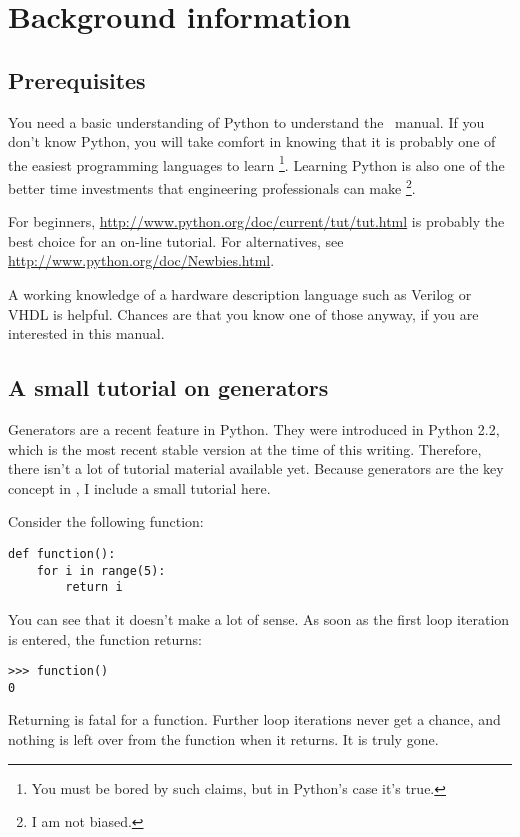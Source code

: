 \chapter{Background information}

\section{Prerequisites}

You need a basic understanding of Python to understand the \myhdl\
manual. If you don't know Python, you will take comfort in knowing
that it is probably one of the easiest programming languages to
learn \footnote{You must be bored by such claims, but in Python's
case it's true.}. Learning Python is also one of the better time
investments that engineering professionals can make \footnote{I am not
biased.}.

For beginners, \url{http://www.python.org/doc/current/tut/tut.html} is
probably the best choice for an on-line tutorial. For alternatives,
see \url{http://www.python.org/doc/Newbies.html}.

A working knowledge of a hardware description language such as Verilog
or VHDL is helpful. Chances are that you know one of those anyway, if
you are interested in this manual.

\section{A small tutorial on generators}

Generators are a recent feature in Python. They were introduced in
Python 2.2, which is the most recent stable version at the time of
this writing. Therefore, there isn't a lot of tutorial material
available yet. Because generators are the key concept in
\myhdl{}, I include a small tutorial here.

Consider the following function:

\begin{verbatim}
def function():
    for i in range(5):
        return i

\end{verbatim}

You can see that it doesn't make a lot of sense. As soon as the first
loop iteration is entered, the function returns:

\begin{verbatim}
>>> function()
0
\end{verbatim}

Returning is fatal for a function. Further loop iterations never get a
chance, and nothing is left over from the function when it returns. It
is truly gone.

